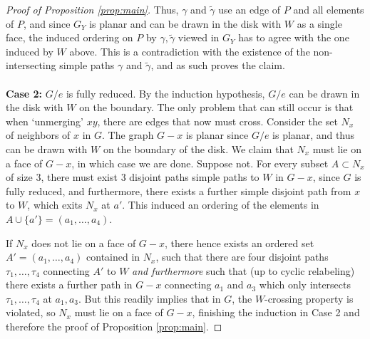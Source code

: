 \documentclass{article}
\numberwithin{equation}{section}
\theoremstyle{definition}
\theoremstyle{definition}
\theoremstyle{remark}
\begin{document}
\begin{appendices}
\begin{proof}[Proof of Proposition \ref{prop:main}]
	Thus, $\gamma$ and $\widetilde{\gamma}$ use an edge of $P$ and all elements of $P$, 
	and since $G_Y$ is planar and can be drawn in the disk with $W$ as a single face, the induced ordering on $P$ by $\gamma, \widetilde{\gamma}$
	viewed in $G_Y$ has to agree with the one induced by $W$ above. 
	This is a contradiction with the existence of the non-intersecting simple paths $\gamma$ and $\widetilde{\gamma}$,
	and as such proves the claim. 
	\\
	\\
	\textbf{Case 2:} $G / e$ is fully reduced. 
	By the induction hypothesis, $G / e$ can be drawn in the disk with $W$ on the boundary. 
	The only problem that can still occur is that when `unmerging' $xy$, there are edges that now must cross. 
	Consider the set $N_x$ of neighbors of $x$ in $G$. 
	The graph $G - x$ is planar since $G / e$ is planar, and thus can be drawn with $W$ on the boundary of the disk. 
	We claim that $N_x$ must lie on a face of $G - x$, in which case we are done. 
	Suppose not. 
	For every subset $A \subset N_x$ of size $3$, there must exist $3$ disjoint paths simple paths to $W$ in $G - x$, 
	since $G$ is fully reduced, and furthermore, there exists a further simple disjoint path from $x$ to $W$, 
	which exits $N_x$ at $a'$. 
	This induced an ordering of the elements in $A \cup \{a'\} = (a_1, \ldots, a_4)$. 
	
	If $N_x$ does not lie on a face of $G - x$, there hence exists an ordered set $A' = (a_1, \ldots, a_4)$ contained in $N_x$, 
	such that there are four disjoint paths $\tau_1, \ldots, \tau_4$ connecting $A'$ to $W$ \emph{and furthermore} such that
	(up to cyclic relabeling) there exists a further path in $G - x$ connecting $a_1$ and $a_3$ which only intersects $\tau_1, \ldots, \tau_4$ 
	at $a_1, a_3$. 
	But this readily implies that in $G$, the $W$-crossing property is violated, so $N_x$ must lie on a face of $G - x$,
	finishing the induction in Case 2 and therefore the proof of Proposition \ref{prop:main}. 
\end{proof}
\end{appendices}

\end{document}
